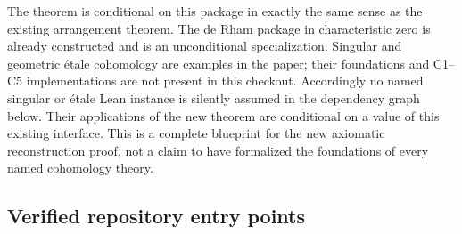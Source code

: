 \documentclass[11pt]{article}
\theoremstyle{remark}\newtheorem{remark}[theorem]{Remark}
\begin{document}
The theorem is conditional on this package in exactly the same sense
as the existing arrangement theorem. The de Rham package in
characteristic zero is already constructed and is an unconditional
specialization. Singular and geometric \'etale cohomology are examples
in the paper; their foundations and C1--C5 implementations are not
present in this checkout. Accordingly no named singular or \'etale
Lean instance is silently assumed in the dependency graph below.
Their applications of the new theorem are conditional on a value of
this existing interface. This is a complete blueprint for the new
axiomatic reconstruction proof, not a claim to have formalized the
foundations of every named cohomology theory.

\subsection{Verified repository entry points}
\end{document}
